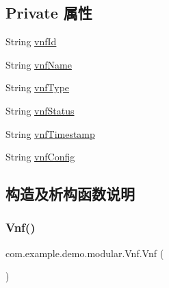 \subsection*{Private 属性}
\begin{DoxyCompactItemize}
\item 
String \mbox{\hyperlink{classcom_1_1example_1_1demo_1_1modular_1_1_vnf_a3a636f275db30e480bef5aad900979c3}{vnf\+Id}}
\item 
String \mbox{\hyperlink{classcom_1_1example_1_1demo_1_1modular_1_1_vnf_a38cae2daf10c2cdf85f7518da4236f57}{vnf\+Name}}
\item 
String \mbox{\hyperlink{classcom_1_1example_1_1demo_1_1modular_1_1_vnf_aa5f7a03f548a4bc1ed654b2f4011dba1}{vnf\+Type}}
\item 
String \mbox{\hyperlink{classcom_1_1example_1_1demo_1_1modular_1_1_vnf_ac527b9b915a9d7ce5d8e043ef5b67ef5}{vnf\+Status}}
\item 
String \mbox{\hyperlink{classcom_1_1example_1_1demo_1_1modular_1_1_vnf_a36bceb91ee138a8c7cf6e485cafb5183}{vnf\+Timestamp}}
\item 
String \mbox{\hyperlink{classcom_1_1example_1_1demo_1_1modular_1_1_vnf_a03ea73b5ecb79146538403f79c7383bf}{vnf\+Config}}
\end{DoxyCompactItemize}


\subsection{构造及析构函数说明}
\mbox{\label{classcom_1_1example_1_1demo_1_1modular_1_1_vnf_a4928fcf0ef98283ef7faf6c8f7a14ee5}} 
\subsubsection{\texorpdfstring{Vnf()}{Vnf()}\hspace{0.1cm}{\footnotesize\ttfamily [1/3]}}
{\footnotesize\ttfamily com.\+example.\+demo.\+modular.\+Vnf.\+Vnf (\begin{DoxyParamCaption}{ }\end{DoxyParamCaption})}

\mbox{\label{classcom_1_1example_1_1demo_1_1modular_1_1_vnf_a12c82c94eb21c3d5dd8babffb632cadd}} 
